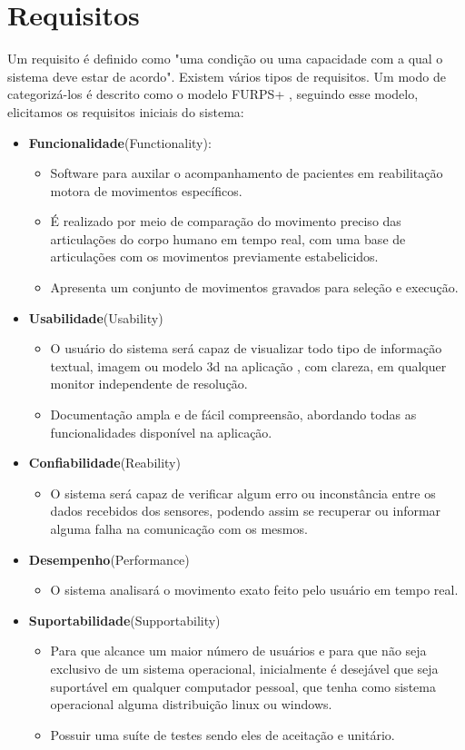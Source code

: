 \section {Requisitos}
\label{Sec:Requisitos}
  Um requisito é definido como "uma condição ou uma capacidade com a qual o 
sistema deve estar de acordo"\cite{requisitos}. Existem vários tipos de 
requisitos. Um modo de categorizá-los é descrito como o modelo 
FURPS+\cite{robertGrady} , seguindo esse modelo, elicitamos os requisitos 
iniciais do sistema: 
  \begin{itemize}
  \item \textbf{Funcionalidade}(Functionality):
    \begin{itemize}
    \item Software para auxilar o acompanhamento de pacientes em reabilitação 
    motora de movimentos específicos.
    \item É realizado por meio de comparação do movimento preciso das articulações do
     corpo humano em tempo real, com uma base de articulações com os movimentos 
    previamente estabelicidos.
    \item Apresenta um conjunto de movimentos gravados para seleção e execução.
    \end{itemize}
  \item \textbf{Usabilidade}(Usability)
    \begin{itemize}
    \item O usuário do sistema será capaz de visualizar todo tipo de informação
     textual, imagem ou modelo 3d na aplicação , com clareza, em qualquer 
    monitor independente de resolução.
    \item Documentação ampla e de fácil compreensão, abordando todas as 
    funcionalidades disponível na aplicação.
    \end{itemize}
\item \textbf{Confiabilidade}(Reability)
    \begin{itemize}
    \item O sistema será capaz de verificar algum erro ou inconstância entre os
     dados recebidos dos sensores, podendo assim se recuperar ou informar 
    alguma falha na comunicação com os mesmos.
    \end{itemize}
\item \textbf{Desempenho}(Performance)
    \begin{itemize}
    \item O sistema analisará o movimento exato feito pelo usuário em tempo real.
    \end{itemize}
\item \textbf{Suportabilidade}(Supportability)
    \begin{itemize}
    \item Para que alcance um maior número de usuários e para que não seja exclusivo de um sistema operacional,
 inicialmente é desejável que seja suportável em qualquer computador pessoal, que tenha como sistema
     operacional alguma distribuição linux ou windows.
    \item Possuir uma suíte de testes sendo eles de aceitação e unitário.
    \end{itemize}
  \end{itemize}

